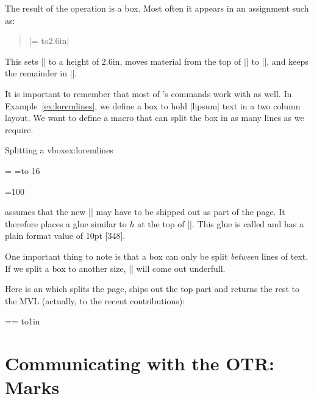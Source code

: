 The result of the operation is a box. Most often it appears in an assignment such as: 

\begin{quote}
|= to2.6in| 
\end{quote}

This sets || to a
height of 2.6in, moves material from the top of
|| to ||, and keeps the remainder in ||.

\begin{macro}{\loremlines}
It is important to remember that most of \tex's commands work with \latex as well. In Example~\ref{ex:loremlines}, we define a box to hold |lipsum| text in a two column layout. We want to define a macro that can split the box in as many lines as we require. 
\end{macro}

\begin{texexample}{Splitting a vbox}{ex:loremlines}
\newbox\one
\newbox\two
\long\gdef\loremlines#1#2{%
   \setbox\one=\vbox {#2}
   \setbox\two=\vsplit\one to #1\baselineskip
   \unvbox\two
   \gdef\boxone{#2}
}
\begin{multicols}{2}
\small
\loremlines{16}{\onepar}
\end{multicols}
\boxone

\setbox\one=\vbox{100}
\the\ht\one \\
\the\baselineskip
\the\splittopskip

\end{texexample}


\tex assumes that the new || may have to
be shipped out as part of the page. It therefore
places a glue similar to $h$ at the top of ||.
This glue is called  and has a plain
format value of 10pt [348].

One important thing to note is that a box can only be split \textit{between} lines of text. 
If we split a box to another size, || will come out underfull.

Here is an \otr which splits the page, ships
out the top part and returns the rest to the MVL
(actually, to the recent contributions):

\begin{teXXX}
\output={= to1in
\shipout{} }
\end{teXXX}






\section{Communicating with the OTR: Marks}


